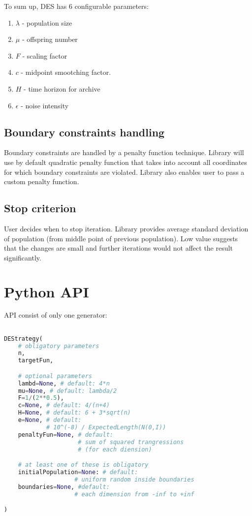\documentclass[11pt,a4paper]{article}
\begin{document}
To sum up, DES has 6 configurable parameters:
\begin{enumerate}
\item $\lambda$ - population size
\item $\mu$ - offspring number
\item $F$ - scaling factor
\item $c$ - midpoint smootching factor.
\item $H$ - time horizon for archive
\item $\epsilon$ - noise intensity
\end{enumerate}

\subsection{Boundary constraints handling}\label{subsec:constraints}

Boundary constraints are handled by a penalty function technique.
Library will use by default quadratic penalty function that takes into account all coordinates for which boundary constraints are violated.
Library also enables user to pass a custom penalty function.

\subsection{Stop criterion}\label{subsec:stop}
User decides when to stop iteration.
Library provides average standard deviation of population (from middle point of previous population).
Low value suggests that the changes are small and further iterations would not affect the result significantly.

\section{Python API}\label{sec:api}
API consist of only one generator:


\begin{lstlisting}[language=Python]

DEStrategy(
    # obligatory parameters
    n,
    targetFun,

    # optional parameters
    lambd=None, # default: 4*n
    mu=None, # default: lambda/2
    F=1/(2**0.5),
    c=None, # default: 4/(n+4)
    H=None, # default: 6 + 3*sqrt(n)
    e=None, # default:
            # 10^(-8) / ExpectedLength(N(0,I))
    penaltyFun=None, # default:
                     # sum of squared trangressions
                     # (for each diension)

    # at least one of these is obligatory
    initialPopulation=None: # default:
                    # uniform random inside boundaries
    boundaries=None, #default:
                    # each dimension from -inf to +inf

)

\end{lstlisting}
\end{document}
